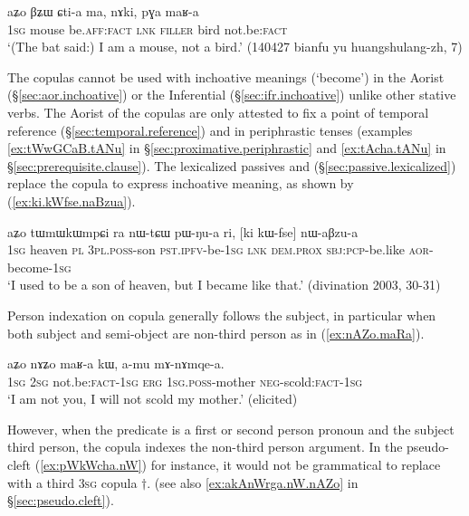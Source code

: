 \begin{exe}
\ex \label{ex:Ctia.ma.maRa}
\gll  aʑo βʑɯ ɕti-a ma, nɤki, pɣa maʁ-a \\
\textsc{1sg} mouse be.\textsc{aff}:\textsc{fact} \textsc{lnk} \textsc{filler} bird not.be:\textsc{fact} \\
\glt  `(The bat said:) I am a mouse, not a bird.' (140427 bianfu yu huangshulang-zh, 7)
\end{exe} 

The copulas cannot be used with inchoative meanings (`become')  in the Aorist (§\ref{sec:aor.inchoative}) or the Inferential (§\ref{sec:ifr.inchoative}) unlike other stative verbs. The Aorist of the copulas are only attested to fix a point of temporal reference (§\ref{sec:temporal.reference}) and in periphrastic tenses (examples \ref{ex:tWwGCaB.tANu} in  §\ref{sec:proximative.periphrastic} and \ref{ex:tAcha.tANu} in  §\ref{sec:prerequisite.clause}). The lexicalized passives   and   (§\ref{sec:passive.lexicalized}) replace the copula to express inchoative meaning, as shown by (\ref{ex:ki.kWfse.naBzua}). 

\begin{exe}
\ex \label{ex:ki.kWfse.naBzua}
\gll   aʑo tɯmɯkɯmpɕi ra nɯ-tɕɯ pɯ-ŋu-a ri, [ki kɯ-fse] nɯ-aβzu-a \\
\textsc{1sg} heaven \textsc{pl} \textsc{3pl}.\textsc{poss}-son \textsc{pst}.\textsc{ipfv}-be-\textsc{1sg} \textsc{lnk} \textsc{dem}.\textsc{prox} \textsc{sbj}:\textsc{pcp}-be.like \textsc{aor}-become-\textsc{1sg} \\
\glt `I used to be a son of heaven, but I became like that.' (divination 2003, 30-31)
\end{exe}

Person indexation on copula generally follows the subject, in particular when both subject and semi-object are non-third person as in (\ref{ex:nAZo.maRa}).

\begin{exe}
\ex \label{ex:nAZo.maRa}
\gll aʑo nɤʑo maʁ-a kɯ, a-mu mɤ-nɤmqe-a. \\
\textsc{1sg} \textsc{2sg} not.be:\textsc{fact}-\textsc{1sg} \textsc{erg} \textsc{1sg}.\textsc{poss}-mother \textsc{neg}-scold:\textsc{fact}-\textsc{1sg} \\
\glt `I am not you, I will not scold my mother.' (elicited)
\end{exe}

However, when the predicate is a first or second person pronoun and the subject third person, the copula indexes the non-third person argument. In the pseudo-cleft (\ref{ex:pWkWcha.nW})  for instance, it would not be  grammatical to  replace   with a third \textsc{3sg} copula $\dagger$. (see also  \ref{ex:akAnWrga.nW.nAZo} in §\ref{sec:pseudo.cleft}).  

